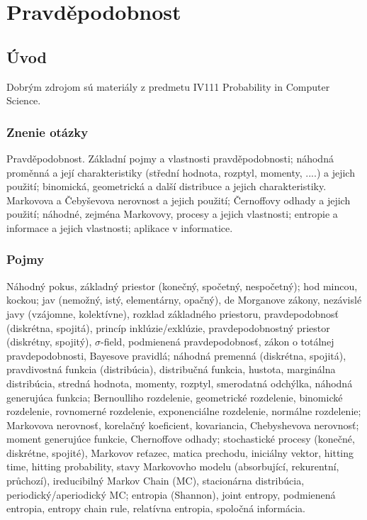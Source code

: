 \section{Pravděpodobnost}

\subsection{Úvod}
Dobrým zdrojom sú materiály z predmetu IV111 Probability in Computer Science.

\subsubsection{Znenie otázky}
Pravděpodobnost. Základní pojmy a vlastnosti pravděpodobnosti; 
náhodná proměnná a její charakteristiky (střední hodnota, rozptyl, momenty, ....) 
a jejich použití; binomická, geometrická a další distribuce a jejich charakteristiky. 
Markovova a Čebyševova nerovnost a jejich použití; Černoffovy odhady a jejich použití; 
náhodné, zejména Markovovy, procesy a jejich vlastnosti; entropie a informace 
a jejich vlastnosti; aplikace v informatice.

\subsubsection{Pojmy}
Náhodný pokus, základný priestor (konečný, spočetný, nespočetný); hod mincou, kockou;
jav (nemožný, istý, elementárny, opačný), de Morganove zákony, nezávislé 
javy (vzájomne, kolektívne), rozklad základného priestoru, 
pravdepodobnosť (diskrétna, spojitá), princíp inklúzie/exklúzie,
pravdepodobnostný priestor (diskrétny, spojitý), $\sigma$-field, 
podmienená pravdepodobnosť, zákon o totálnej pravdepodobnosti,
Bayesove pravidlá; náhodná premenná (diskrétna, spojitá), 
pravdivostná funkcia (distribúcia), distribučná funkcia, 
hustota, marginálna distribúcia, stredná hodnota, momenty,
rozptyl, smerodatná odchýlka, náhodná generujúca funkcia;
Bernoulliho rozdelenie, geometrické rozdelenie, binomické
rozdelenie, rovnomerné rozdelenie, exponenciálne rozdelenie,
normálne rozdelenie; Markovova nerovnosť, korelačný koeficient,
kovariancia, Chebyshevova nerovnosť; moment generujúce funkcie,
Chernoffove odhady; stochastické procesy (konečné, diskrétne,
spojité), Markovov reťazec, matica prechodu, iniciálny vektor,
hitting time, hitting probability, stavy Markovovho
modelu (absorbující, rekurentní, průchozí), ireducibilný Markov Chain (MC),
stacionárna distribúcia, periodický/aperiodický MC;
entropia (Shannon), joint entropy, podmienená entropia, 
entropy chain rule, relatívna entropia, spoločná informácia.


